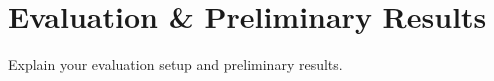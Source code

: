 \section{Evaluation \& Preliminary Results}
\label{sec:evaluation}

Explain your evaluation setup and preliminary results. 
